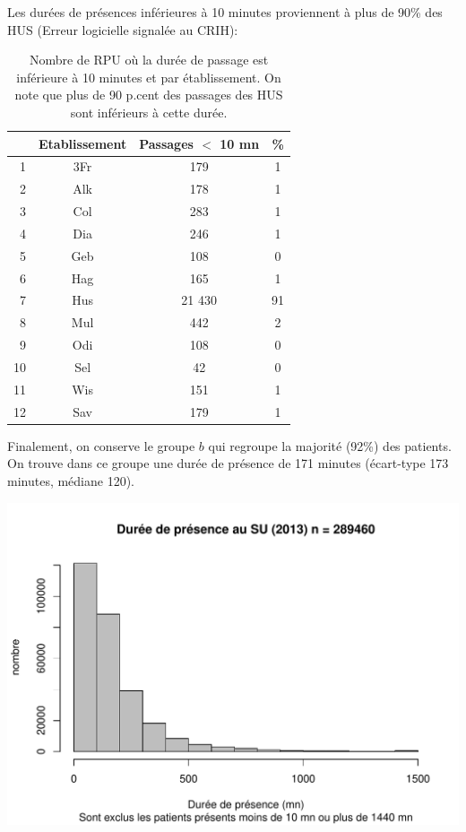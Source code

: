 \documentclass[12pt,english,french,twoside]{book}\usepackage[]{graphicx}\usepackage[]{color}
\makeatletter
\def\maxwidth{ %
  \ifdim\Gin@nat@width>\linewidth
    \linewidth
  \else
    \Gin@nat@width
  \fi
}
\newenvironment{knitrout}{}{} %
\makeatother
\begin{document}
Les durées de présences inférieures à 10 minutes proviennent à plus de 90\% des HUS (Erreur logicielle signalée au CRIH):
\begin{table}[ht]
\centering
\begin{tabular}{rccc}
  \hline
 & Etablissement & Passages $<$ 10 mn & \% \\ 
  \hline
1 & 3Fr & 179 & 1 \\ 
  2 & Alk & 178 & 1 \\ 
  3 & Col & 283 & 1 \\ 
  4 & Dia & 246 & 1 \\ 
  5 & Geb & 108 & 0 \\ 
  6 & Hag & 165 & 1 \\ 
  7 & Hus & 21 430 & 91 \\ 
  8 & Mul & 442 & 2 \\ 
  9 & Odi & 108 & 0 \\ 
  10 & Sel & 42 & 0 \\ 
  11 & Wis & 151 & 1 \\ 
  12 & Sav & 179 & 1 \\ 
   \hline
\end{tabular}
\caption[Nombre de passages par service d'urgence de moins de 10 mn]{Nombre de RPU où la durée de passage est inférieure à 10 minutes et par établissement. On note que plus de 90 p.cent des passages des HUS sont inférieurs à cette durée.} 
\label{fig:passages10}
\end{table}


Finalement, on conserve le groupe $b$ qui regroupe la majorité (92\%) des patients. On trouve dans ce groupe une durée de présence de 171 minutes (écart-type 173 minutes, médiane 120).

\begin{center}
\begin{knitrout}
\color{fgcolor}
\includegraphics[width=\maxwidth]{figure/passages_clean_hist-1} 

\end{knitrout}
\end{center}
\end{document}
